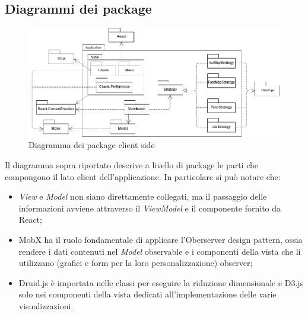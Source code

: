 \subsection{Diagrammi dei package}
\begin{figure}[hb]
\includegraphics[width=15.8cm]{Images/Allegato Tecnico-Package}
\centering
\caption{Diagramma dei package client side}
\end{figure}

Il diagramma sopra riportato descrive a livello di package le parti che compongono il lato client dell'applicazione. In particolare si può notare che:
\begin{itemize}
	\item \textit{View} e \textit{Model} non siano direttamente collegati, ma il passaggio delle informazioni avviene attraverso il \textit{ViewModel} e il componente  fornito da React;
	\item MobX ha il ruolo fondamentale di applicare l'Oberserver design pattern, ossia rendere i dati contenuti nel \textit{Model} observable e i componenti della vista che li utilizzano (grafici e form per la loro personalizzazione) observer;
	\item Druid.js è importata nelle classi per eseguire la riduzione dimensionale e D3.js solo nei componenti della vista dedicati all'implementazione delle varie visualizzazioni.
\end{itemize}  %



